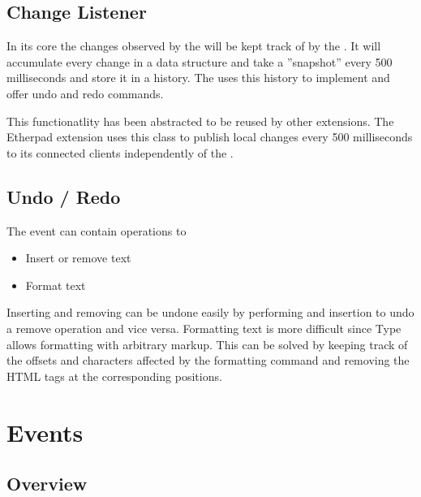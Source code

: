 \subsection{Change Listener}

In its core the changes observed by the  will be kept track of by the . It will accumulate every change in a data structure and take a ''snapshot'' every 500 milliseconds and store it in a history. The  uses this history to implement and offer undo and redo commands.

This functionatlity has been abstracted to be reused by other extensions. The Etherpad extension uses this class to publish local changes every 500 milliseconds to its connected clients independently of the .

\subsection{Undo / Redo}

The  event can contain operations to

\begin{itemize}
\item Insert or remove text
\item Format text
\end{itemize}

Inserting and removing can be undone easily by performing and insertion to undo a remove operation and vice versa. Formatting text is more difficult since Type allows formatting with arbitrary markup. This can be solved by keeping track of the offsets and characters affected by the formatting command and removing the HTML tags at the corresponding positions.






\section{Events}
\label{sec:events}
\subsection{Overview}

